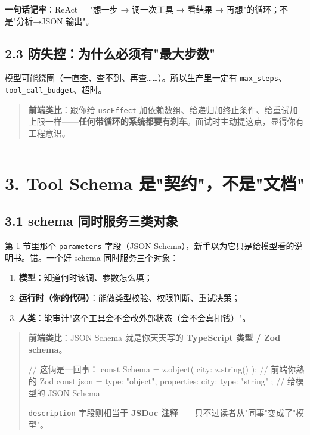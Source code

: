 \textbf{一句话记牢}：ReAct = "想一步 → 调一次工具 → 看结果 → 再想"的循环；不是"分析→JSON 输出"。

\subsection{2.3 防失控：为什么必须有"最大步数"}

模型可能绕圈（一直查、查不到、再查……）。所以生产里一定有 \texttt{max\_steps}、\texttt{tool\_call\_budget}、超时。

\begin{quote}
 \textbf{前端类比}：跟你给 \texttt{useEffect} 加依赖数组、给递归加终止条件、给重试加上限一样——\textbf{任何带循环的系统都要有刹车}。面试时主动提这点，显得你有工程意识。
\end{quote}

\bigskip\hrule\bigskip

\section{3. Tool Schema 是"契约"，不是"文档"}

\subsection{3.1 schema 同时服务三类对象}

第 1 节里那个 \texttt{parameters} 字段（JSON Schema），新手以为它只是给模型看的说明书。错。一个好 schema 同时服务三个对象：

\begin{enumerate}[leftmargin=2em]
\item \textbf{模型}：知道何时该调、参数怎么填；
\item \textbf{运行时（你的代码）}：能做类型校验、权限判断、重试决策；
\item \textbf{人类}：能审计"这个工具会不会改外部状态（会不会真扣钱）"。
\end{enumerate}

\begin{quote}
 \textbf{前端类比}：JSON Schema 就是你天天写的 \textbf{TypeScript 类型 / Zod schema}。
\begin{codeblock}
// 这俩是一回事：
const Schema = z.object({ city: z.string() });          // 前端你熟的 Zod
const json   = { type: "object", properties: { city: { type: "string" } } };  // 给模型的 JSON Schema
\end{codeblock}
\texttt{description} 字段则相当于 \textbf{JSDoc 注释}——只不过读者从"同事"变成了"模型"。
\end{quote}

